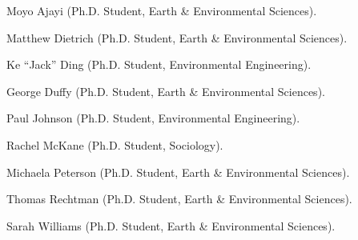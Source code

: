 \item Moyo Ajayi (Ph.D. Student, Earth \& Environmental Sciences).
\item Matthew Dietrich (Ph.D. Student, Earth \& Environmental Sciences).
\item Ke ``Jack'' Ding (Ph.D. Student, Environmental Engineering).
\item George Duffy (Ph.D. Student, Earth \& Environmental Sciences).
\item Paul Johnson (Ph.D. Student, Environmental Engineering).
\item Rachel McKane (Ph.D. Student, Sociology).
\item Michaela Peterson (Ph.D. Student, Earth \& Environmental Sciences).
\item Thomas Rechtman (Ph.D. Student, Earth \& Environmental Sciences).
\item Sarah Williams (Ph.D. Student, Earth \& Environmental Sciences).
